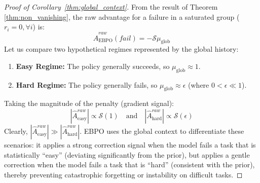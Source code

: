 \documentclass{article}
\theoremstyle{plain}
\theoremstyle{definition}
\theoremstyle{remark}
\begin{document}
\begin{proof}[Proof of Corollary~\ref{thm:global_context}]
From the result of Theorem \ref{thm:non_vanishing}, the raw advantage for a failure in a saturated group ($r_i=0, \forall i$) is:
$$ \hat{A}^{raw}_{\text{EBPO}}(fail) = -\mathcal{S}\mu_{\text{glob}} $$
Let us compare two hypothetical regimes represented by the global history:
\begin{enumerate}
    \item \textbf{Easy Regime:} The policy generally succeeds, so $\mu_{\text{glob}} \approx 1$.
    \item \textbf{Hard Regime:} The policy generally fails, so $\mu_{\text{glob}} \approx \epsilon$ (where $0 < \epsilon \ll 1$).
\end{enumerate}
Taking the magnitude of the penalty (gradient signal):
$$ |\hat{A}^{raw}_{\text{easy}}| \propto \mathcal{S}(1) \quad \text{and} \quad |\hat{A}^{raw}_{\text{hard}}| \propto \mathcal{S}(\epsilon) $$
Clearly, $|\hat{A}^{raw}_{\text{easy}}| \gg |\hat{A}^{raw}_{\text{hard}}|$. 
EBPO uses the global context to differentiate these scenarios: it applies a strong correction signal when the model fails a task that is statistically ``easy'' (deviating significantly from the prior), but applies a gentle correction when the model fails a task that is ``hard'' (consistent with the prior), thereby preventing catastrophic forgetting or instability on difficult tasks.
\end{proof}
\end{document}
